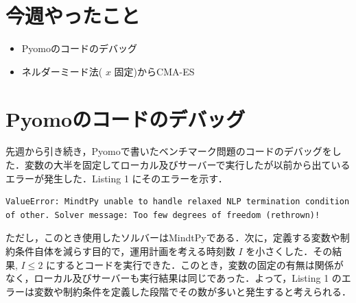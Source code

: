 \documentclass[twocolumn]{jarticle}
\begin{document}


\section{今週やったこと}
	\begin{itemize}
        \item Pyomoのコードのデバッグ
        \item ネルダーミード法( $x$ 固定)からCMA-ES
	\end{itemize}

\section{Pyomoのコードのデバッグ}
    先週から引き続き，Pyomoで書いたベンチマーク問題のコードのデバッグをした．変数の大半を固定してローカル及びサーバーで実行したが以前から出ているエラーが発生した．Listing 1 にそのエラーを示す．
    \begin{lstlisting}[caption = 発生したエラー]
        ValueError: MindtPy unable to handle relaxed NLP termination condition of other. Solver message: Too few degrees of freedom (rethrown)!
    \end{lstlisting}
    ただし，このとき使用したソルバーはMindtPyである．次に，定義する変数や制約条件自体を減らす目的で，運用計画を考える時刻数 $I$ を小さくした．その結果, $I\leq2$ にするとコードを実行できた．このとき，変数の固定の有無は関係がなく，ローカル及びサーバーも実行結果は同じであった．よって，Listing 1 のエラーは変数や制約条件を定義した段階でその数が多いと発生すると考えられる．
    
\end{document}
